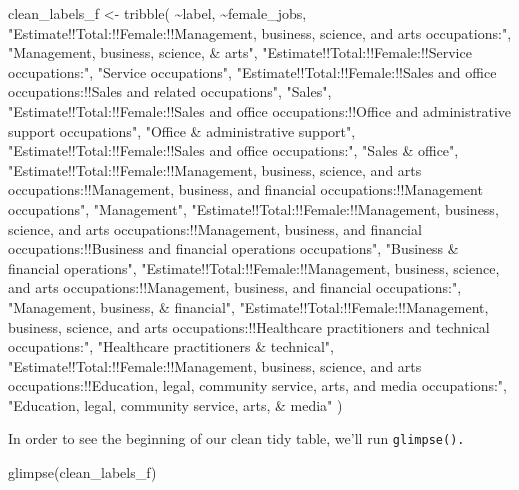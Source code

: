 \documentclass[
  krantz2]{krantz}
\makeatletter
\newenvironment{Shaded}{\begin{snugshade}}{\end{snugshade}}
\newcommand{\FunctionTok}[1]{\textcolor[rgb]{0,0,0}{#1}}
\newcommand{\NormalTok}[1]{#1}
\newcommand{\OtherTok}[1]{\textcolor[rgb]{0.37,0.37,0.37}{#1}}
\newcommand{\SpecialCharTok}[1]{\textcolor[rgb]{0,0,0}{#1}}
\newcommand{\StringTok}[1]{\textcolor[rgb]{0.5,0.5,0.5}{#1}}
\newenvironment{kframe}{%
\medskip{}
\setlength{\fboxsep}{.8em}
 \def\at@end@of@kframe{}%
 \ifinner\ifhmode%
  \def\at@end@of@kframe{\end{minipage}}%
  \begin{minipage}{\columnwidth}%
 \fi\fi%
 \def\FrameCommand##1{\hskip\@totalleftmargin \hskip-\fboxsep
 \colorbox{shadecolor}{##1}\hskip-\fboxsep
     \hskip-\linewidth \hskip-\@totalleftmargin \hskip\columnwidth}%
 \MakeFramed {\advance\hsize-\width
   \@totalleftmargin\z@ \linewidth\hsize
   \@setminipage}}%
 {\par\unskip\endMakeFramed%
 \at@end@of@kframe}
\renewenvironment{Shaded}{\begin{kframe}}{\end{kframe}}
\makeatother
\begin{document}
\begin{Shaded}
\begin{Highlighting}[]
\NormalTok{clean\_labels\_f }\OtherTok{\textless{}{-}} \FunctionTok{tribble}\NormalTok{(}
  \SpecialCharTok{\textasciitilde{}}\NormalTok{label, }\SpecialCharTok{\textasciitilde{}}\NormalTok{female\_jobs,}
  \StringTok{"Estimate!!Total:!!Female:!!Management, business, science, and arts occupations:"}\NormalTok{, }\StringTok{"Management, business, science, \& arts"}\NormalTok{,}
  \StringTok{"Estimate!!Total:!!Female:!!Service occupations:"}\NormalTok{, }\StringTok{"Service occupations"}\NormalTok{,}
  \StringTok{"Estimate!!Total:!!Female:!!Sales and office occupations:!!Sales and related occupations"}\NormalTok{, }\StringTok{"Sales"}\NormalTok{,}
  \StringTok{"Estimate!!Total:!!Female:!!Sales and office occupations:!!Office and administrative support occupations"}\NormalTok{, }\StringTok{"Office \& administrative support"}\NormalTok{,}
  \StringTok{"Estimate!!Total:!!Female:!!Sales and office occupations:"}\NormalTok{, }\StringTok{"Sales \& office"}\NormalTok{,}
  \StringTok{"Estimate!!Total:!!Female:!!Management, business, science, and arts occupations:!!Management, business, and financial occupations:!!Management occupations"}\NormalTok{, }\StringTok{"Management"}\NormalTok{,}
  \StringTok{"Estimate!!Total:!!Female:!!Management, business, science, and arts occupations:!!Management, business, and financial occupations:!!Business and financial operations occupations"}\NormalTok{, }\StringTok{"Business \& financial operations"}\NormalTok{,}
  \StringTok{"Estimate!!Total:!!Female:!!Management, business, science, and arts occupations:!!Management, business, and financial occupations:"}\NormalTok{, }\StringTok{"Management, business, \& financial"}\NormalTok{,}
  \StringTok{"Estimate!!Total:!!Female:!!Management, business, science, and arts occupations:!!Healthcare practitioners and technical occupations:"}\NormalTok{, }\StringTok{"Healthcare practitioners \& technical"}\NormalTok{,}
  \StringTok{"Estimate!!Total:!!Female:!!Management, business, science, and arts occupations:!!Education, legal, community service, arts, and media occupations:"}\NormalTok{, }\StringTok{"Education, legal, community service, arts, \& media"}
\NormalTok{)}
\end{Highlighting}
\end{Shaded}

In order to see the beginning of our clean tidy table, we'll run \texttt{glimpse().}

\begin{Shaded}
\begin{Highlighting}[]
\FunctionTok{glimpse}\NormalTok{(clean\_labels\_f)}
\end{Highlighting}
\end{Shaded}
\end{document}
